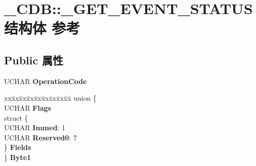 \hypertarget{struct___c_d_b_1_1___g_e_t___e_v_e_n_t___s_t_a_t_u_s}{}\section{\+\_\+\+C\+DB\+:\+:\+\_\+\+G\+E\+T\+\_\+\+E\+V\+E\+N\+T\+\_\+\+S\+T\+A\+T\+U\+S结构体 参考}
\label{struct___c_d_b_1_1___g_e_t___e_v_e_n_t___s_t_a_t_u_s}
\subsection*{Public 属性}
\begin{DoxyCompactItemize}
\item 
\mbox{\label{struct___c_d_b_1_1___g_e_t___e_v_e_n_t___s_t_a_t_u_s_ae11361d9632bc927dcc78fe177233695}} 
U\+C\+H\+AR {\bfseries Operation\+Code}
\item 
\mbox{\label{struct___c_d_b_1_1___g_e_t___e_v_e_n_t___s_t_a_t_u_s_a672de02629f4d3871194c688d041364e}} 
\begin{tabbing}
xx\=xx\=xx\=xx\=xx\=xx\=xx\=xx\=xx\=\kill
union \{\\
\>UCHAR {\bfseries Flags}\\
\>struct \{\\
\>\>UCHAR {\bfseries Immed}: 1\\
\>\>UCHAR {\bfseries Reserved0}: 7\\
\>\} {\bfseries Fields}\\
\} {\bfseries Byte1}\\


\end{tabbing}
\end{DoxyCompactItemize}
